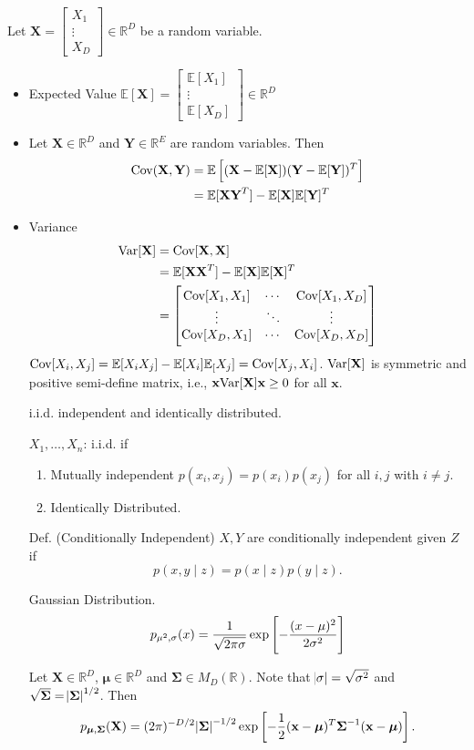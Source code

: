 \documentclass[12pt,openany]{book}
\theoremstyle{definition}
\newcommand{\R}{\mathbb{R}}
\newcommand{\E}{\mathbb{E}}
\newcommand{\ie}{\textnormal{i.e.}}
\newcommand{\Cov}{\textnormal{Cov}}
\newcommand{\Var}{\textnormal{Var}}
\newcommand{\mvec}[1]{\boldsymbol{#1}}
\renewcommand{\vec}[1]{\textbf{#1}}
\begin{document}
	Let $\vec{X}=\begin{bmatrix}
		X_1\\ \vdots\\ X_D
	\end{bmatrix}\in\R^D$ be a random variable.
	\begin{itemize}
		\item Expected Value $\E[\vec{X}]=\begin{bmatrix}
			\E[X_1]\\ \vdots\\ \E[X_D]
		\end{bmatrix}\in\R^D$
	\item Let $\vec{X}\in\R^D$ and $\vec{Y}\in\R^E$ are random variables. Then \begin{align*}
		\Cov(\vec{X},\vec{Y})&=\E\sbr{(\vec{X}-\E[\vec{X}])(\vec{Y}-\E[\vec{Y}])^T}\\
		&=\E[\vec{X}\vec{Y}^T]-\E[\vec{X}]\E[\vec{Y}]^T
	\end{align*}
	\item Variance \begin{align*}
		\Var[\vec{X}]&=\Cov[\vec{X},\vec{X}]\\
		&=\E[\vec{X}\vec{X}^T]-\E[\vec{X}]\E[\vec{X}]^T\\
		&=\begin{bmatrix}
			\Cov[X_1,X_1] & \cdots & \Cov[X_1,X_D]\\
			\vdots & \ddots & \vdots\\
			\Cov[X_D,X_1] & \cdots & \Cov[X_D,X_D]\\
		\end{bmatrix}
	\end{align*}
	$\Cov[X_i,X_j]=\E[X_iX_j]-\E[X_i]\E_[X_j]=\Cov[X_j,X_i]$. $\Var[\vec{X}]$ is symmetric and positive semi-define matrix, \ie, $\vec{x}\Var[\vec{X}]\vec{x}\geq 0$ for all $\vec{x}$.
	
		i.i.d. independent and identically distributed.
	
	$X_1,\dots,X_n$: i.i.d. if \begin{enumerate}[(1)]
		\item Mutually independent $p(x_i,x_j)=p(x_i)p(x_j)$ for all $i,j$ with $i\neq j$.
		\item Identically Distributed.
	\end{enumerate}
	
	Def. (Conditionally Independent) $X,Y$ are conditionally independent given $Z$ if \[
	p(x,y\mid z)=p(x\mid z)p(y\mid z).
	\]
	
	Gaussian Distribution. \[
	p_{\mu^2,\sigma}(x)=\frac{1}{\sqrt{2\pi\sigma}}\exp\sbr{-\frac{(x-\mu)^2}{2\sigma^2}}
	\]
	
	Let $\vec{X}\in\R^D$, $\mvec{\mu}\in\R^D$ and $\mvec{\Sigma}\in M_{D}(\R)$. Note that $\abs{\sigma}=\sqrt{\sigma^2}$ and $\sqrt{\mvec{\Sigma}}=\abs{\mvec{\Sigma}}^{1/2}$. Then \[
	p_{\mvec{\mu},\mvec{\Sigma}}(\vec{X})=(2\pi)^{-D/2}\abs{\mvec{\Sigma}}^{-1/2}\exp\sbr{-\frac{1}{2}(\vec{x}-\mvec{\mu})^T\mvec{\Sigma}^{-1}(\vec{x}-\mvec{\mu})}.
	\]
	\end{itemize}
	
\end{document}
